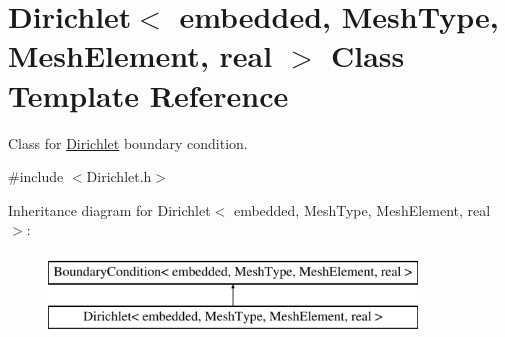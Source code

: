 \hypertarget{class_dirichlet}{}\section{Dirichlet$<$ embedded, Mesh\+Type, Mesh\+Element, real $>$ Class Template Reference}
\label{class_dirichlet}


Class for \hyperlink{class_dirichlet}{Dirichlet} boundary condition.  




{\ttfamily \#include $<$Dirichlet.\+h$>$}

Inheritance diagram for Dirichlet$<$ embedded, Mesh\+Type, Mesh\+Element, real $>$\+:\begin{figure}[H]
\begin{center}
\leavevmode
\includegraphics[height=2.000000cm]{class_dirichlet}
\end{center}
\end{figure}
